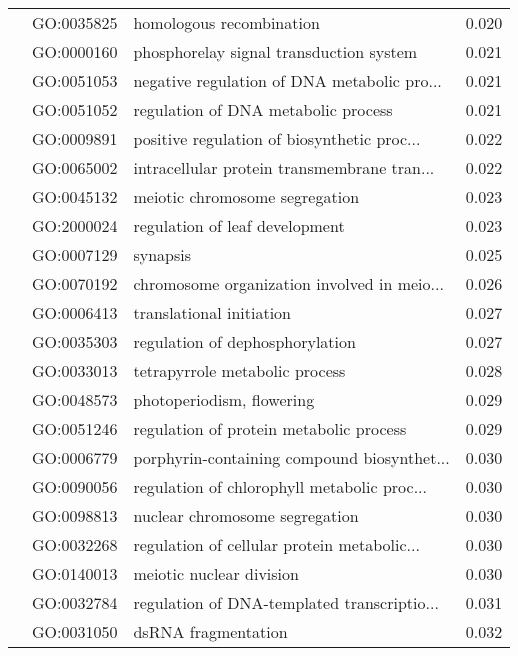 \begin{longtable}{lllr}
   & GO:0035825 &                     homologous recombination &         0.020 \\
   & GO:0000160 &      phosphorelay signal transduction system &         0.021 \\
   & GO:0051053 &  negative regulation of DNA metabolic pro... &         0.021 \\
   & GO:0051052 &          regulation of DNA metabolic process &         0.021 \\
   & GO:0009891 &  positive regulation of biosynthetic proc... &         0.022 \\
   & GO:0065002 &  intracellular protein transmembrane tran... &         0.022 \\
   & GO:0045132 &               meiotic chromosome segregation &         0.023 \\
   & GO:2000024 &               regulation of leaf development &         0.023 \\
   & GO:0007129 &                                     synapsis &         0.025 \\
   & GO:0070192 &  chromosome organization involved in meio... &         0.026 \\
   & GO:0006413 &                     translational initiation &         0.027 \\
   & GO:0035303 &              regulation of dephosphorylation &         0.027 \\
   & GO:0033013 &               tetrapyrrole metabolic process &         0.028 \\
   & GO:0048573 &                    photoperiodism, flowering &         0.029 \\
   & GO:0051246 &      regulation of protein metabolic process &         0.029 \\
   & GO:0006779 &  porphyrin-containing compound biosynthet... &         0.030 \\
   & GO:0090056 &  regulation of chlorophyll metabolic proc... &         0.030 \\
   & GO:0098813 &               nuclear chromosome segregation &         0.030 \\
   & GO:0032268 &  regulation of cellular protein metabolic... &         0.030 \\
   & GO:0140013 &                     meiotic nuclear division &         0.030 \\
   & GO:0032784 &  regulation of DNA-templated transcriptio... &         0.031 \\
   & GO:0031050 &                          dsRNA fragmentation &         0.032 \\

\end{longtable}
